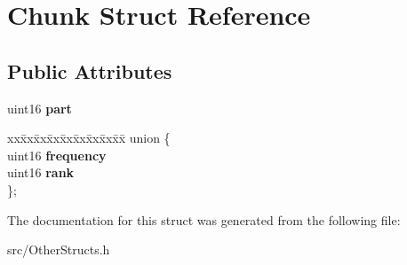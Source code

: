 \section{Chunk Struct Reference}
\label{structChunk}
\subsection*{Public Attributes}
\begin{DoxyCompactItemize}
\item 
uint16 {\bfseries part}\label{structChunk_acd55aa2a4e5bc6ac69f7d52994d5b74e}

\item 
\begin{tabbing}
xx\=xx\=xx\=xx\=xx\=xx\=xx\=xx\=xx\=\kill
union \{\\
\>uint16 {\bfseries frequency}\\
\>uint16 {\bfseries rank}\\
\}; \label{structChunk_a50267a97294a043466d23d573d94c352}
\\

\end{tabbing}\end{DoxyCompactItemize}


The documentation for this struct was generated from the following file:\begin{DoxyCompactItemize}
\item 
src/OtherStructs.h\end{DoxyCompactItemize}
